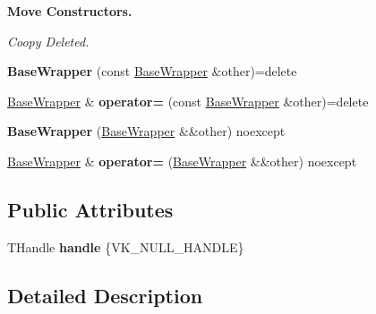 \begin{Indent}\textbf{ Move Constructors.}\par
{\em Coopy Deleted. }\begin{DoxyCompactItemize}
\item 
\mbox{\label{structblaze_1_1vkw_1_1base_1_1BaseWrapper_ac64b4743de1a01d75e26886c3a8d9d43}} 
{\bfseries Base\+Wrapper} (const \hyperlink{structblaze_1_1vkw_1_1base_1_1BaseWrapper}{Base\+Wrapper} \&other)=delete
\item 
\mbox{\label{structblaze_1_1vkw_1_1base_1_1BaseWrapper_af33a63b889c8a60a4eb811bee0799ea4}} 
\hyperlink{structblaze_1_1vkw_1_1base_1_1BaseWrapper}{Base\+Wrapper} \& {\bfseries operator=} (const \hyperlink{structblaze_1_1vkw_1_1base_1_1BaseWrapper}{Base\+Wrapper} \&other)=delete
\item 
\mbox{\label{structblaze_1_1vkw_1_1base_1_1BaseWrapper_a0ad98e80f12d97cf35b26f2b38553b06}} 
{\bfseries Base\+Wrapper} (\hyperlink{structblaze_1_1vkw_1_1base_1_1BaseWrapper}{Base\+Wrapper} \&\&other) noexcept
\item 
\mbox{\label{structblaze_1_1vkw_1_1base_1_1BaseWrapper_a16f1d424504044c33d699aac5ea5b9e5}} 
\hyperlink{structblaze_1_1vkw_1_1base_1_1BaseWrapper}{Base\+Wrapper} \& {\bfseries operator=} (\hyperlink{structblaze_1_1vkw_1_1base_1_1BaseWrapper}{Base\+Wrapper} \&\&other) noexcept
\end{DoxyCompactItemize}
\end{Indent}
\subsection*{Public Attributes}
\begin{DoxyCompactItemize}
\item 
\mbox{\label{structblaze_1_1vkw_1_1base_1_1BaseWrapper_aa9bd63fd9b4829070702b41e1d3559b4}} 
T\+Handle {\bfseries handle} \{V\+K\+\_\+\+N\+U\+L\+L\+\_\+\+H\+A\+N\+D\+LE\}
\end{DoxyCompactItemize}


\subsection{Detailed Description}
